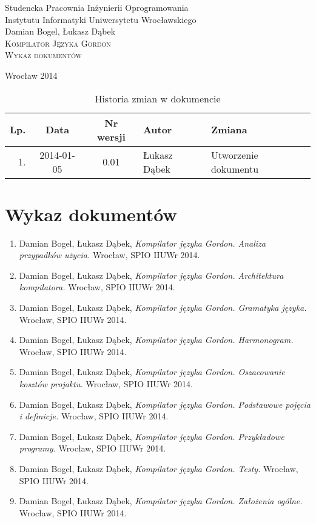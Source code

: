 \documentclass{documentation}
\begin{document}
\begin{titlepage}
\begin{center}
Studencka Pracownia Inżynierii Oprogramowania\\
Instytutu Informatyki Uniwersytetu Wrocławskiego\\[6cm]

Damian Bogel, Łukasz Dąbek\\[1cm]
\textsc{\LARGE Kompilator Języka Gordon}\\[0.5cm]
\textsc{\large Wykaz dokumentów}

\vfill
Wrocław 2014 \\[2.5cm]

\end{center}
\end{titlepage}

\newpage
\begin{table}
	\centering
    \captionsetup{name=Tabela,labelsep=period}
	\caption{Historia zmian w dokumencie}
		\begin{tabular}{|r|c|c|l|l|}
		\hline
		Lp.  & Data       & Nr wersji & Autor                 & Zmiana \\ \hline
		1.   & 2014-01-05 & 0.01 & Łukasz Dąbek & Utworzenie dokumentu \\ \hline
	\end{tabular}
\end{table}
\newpage

\tableofcontents
\setcounter{page}{2}

\newpage

\section{Wykaz dokumentów}

\begin{enumerate}
    \item Damian Bogel, Łukasz Dąbek, \emph{Kompilator języka Gordon. Analiza przypadków użycia.} Wrocław, SPIO IIUWr 2014.
    \item Damian Bogel, Łukasz Dąbek, \emph{Kompilator języka Gordon. Architektura kompilatora.} Wrocław, SPIO IIUWr 2014.
    \item Damian Bogel, Łukasz Dąbek, \emph{Kompilator języka Gordon. Gramatyka języka.} Wrocław, SPIO IIUWr 2014.
    \item Damian Bogel, Łukasz Dąbek, \emph{Kompilator języka Gordon. Harmonogram.} Wrocław, SPIO IIUWr 2014.
    \item Damian Bogel, Łukasz Dąbek, \emph{Kompilator języka Gordon. Oszacowanie kosztów projaktu.} Wrocław, SPIO IIUWr 2014.
    \item Damian Bogel, Łukasz Dąbek, \emph{Kompilator języka Gordon. Podstawowe pojęcia i definicje.} Wrocław, SPIO IIUWr 2014.
    \item Damian Bogel, Łukasz Dąbek, \emph{Kompilator języka Gordon. Przykładowe programy.} Wrocław, SPIO IIUWr 2014.
    \item Damian Bogel, Łukasz Dąbek, \emph{Kompilator języka Gordon. Testy.} Wrocław, SPIO IIUWr 2014.
    \item Damian Bogel, Łukasz Dąbek, \emph{Kompilator języka Gordon. Założenia ogólne.} Wrocław, SPIO IIUWr 2014.
\end{enumerate}
\end{document}
